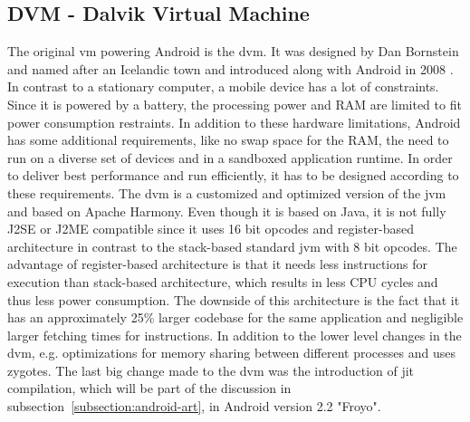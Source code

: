 \subsection{DVM - Dalvik Virtual Machine} \label{subsection:android-dalvik}
The original \gls{vm} powering Android is the \gls{dvm}.
It was designed by Dan Bornstein and named after an Icelandic town and introduced along with Android in 2008 \cite{developersRelease}.
\newline
In contrast to a stationary computer, a mobile device has a lot of constraints.
Since it is powered by a battery, the processing power and RAM are limited to fit power consumption restraints.
In addition to these hardware limitations, Android has some additional requirements, like no swap space for the RAM, the need to run on a diverse set of devices and in a sandboxed application runtime.
In order to deliver best performance and run efficiently, it has to be designed according to these requirements.
\newline
The \gls{dvm} is a customized and optimized version of the \gls{jvm} and based on Apache Harmony.
Even though it is based on Java, it is not fully J2SE or J2ME compatible since it uses 16 bit opcodes and register-based architecture in contrast to the stack-based standard \gls{jvm} with 8 bit opcodes.
The advantage of register-based architecture is that it needs less instructions for execution than stack-based architecture, which results in less CPU cycles and thus less power consumption.
The downside of this architecture is the fact that it has an approximately 25\% larger codebase for the same application and negligible larger fetching times for instructions.
In addition to the lower level changes in the \gls{dvm}, e.g. optimizations for memory sharing between different processes \cite{vecShare} and uses zygotes. \cite{ehringerDalvik} \cite{andevconDalvikART}
\newline
The last big change made to the \gls{dvm} was the introduction of \gls{jit} compilation, which will be part of the discussion in subsection~\ref{subsection:android-art}, in Android version 2.2 "Froyo".
